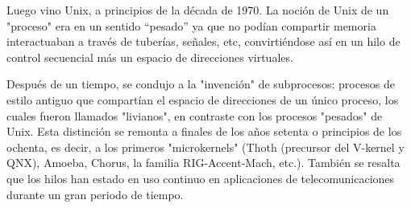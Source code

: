 \documentclass[12pt, letter]{article}
\begin{document}
\setlength{\parindent}{31pt}
Luego vino Unix, a principios de la década de 1970. La noción de Unix de un "proceso" era en un sentido “pesado” ya que no podían compartir memoria interactuaban a través de tuberías, señales, etc, convirtiéndose así en un hilo de control secuencial más un espacio de direcciones virtuales. 

\setlength{\parindent}{31pt}
Después de un tiempo, se condujo a la "invención" de subprocesos: procesos de estilo antiguo que compartían el espacio de direcciones de un único proceso, los cuales fueron llamados "livianos", en contraste con los procesos "pesados" de Unix. Esta distinción se remonta a finales de los años setenta o principios de los ochenta, es decir, a los primeros "microkernels" (Thoth (precursor del V-kernel y QNX), Amoeba, Chorus, la familia RIG-Accent-Mach, etc.). También se resalta que los hilos han estado en uso continuo en aplicaciones de telecomunicaciones durante un gran periodo de tiempo.
\end{document}
